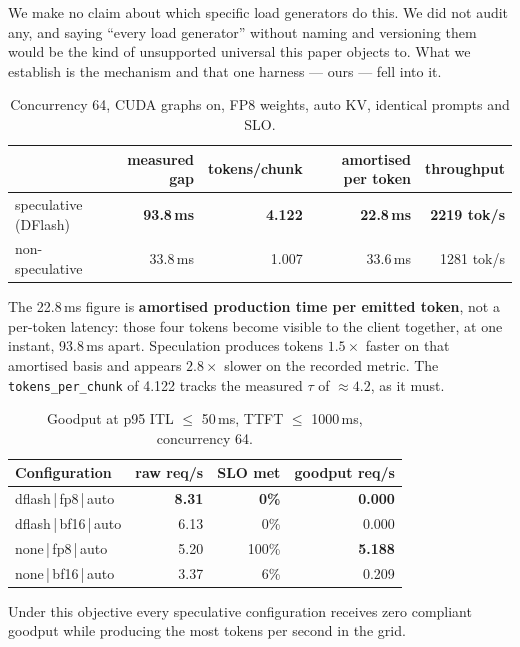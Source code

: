 \documentclass[11pt]{article}
\newcommand{\tw}[1]{\texttt{\small #1}}
\begin{document}
We make no claim about which specific load generators do this. We did not
audit any, and saying ``every load generator'' without naming and versioning
them would be the kind of unsupported universal this paper objects to. What
we establish is the mechanism and that one harness --- ours --- fell into
it.

\begin{table}[h]\centering\small
\caption{Concurrency 64, CUDA graphs on, FP8 weights, auto KV, identical
prompts and SLO.}
\begin{tabular}{lrrrr}
\toprule
& measured gap & tokens/chunk & amortised per token & throughput\\
\midrule
speculative (DFlash) & \textbf{93.8\,ms} & \textbf{4.122} & \textbf{22.8\,ms} & \textbf{2219 tok/s}\\
non-speculative & 33.8\,ms & 1.007 & 33.6\,ms & 1281 tok/s\\
\bottomrule
\end{tabular}
\end{table}

\noindent
The 22.8\,ms figure is \textbf{amortised production time per emitted token},
not a per-token latency: those four tokens become visible to the client
together, at one instant, 93.8\,ms apart. Speculation produces tokens
$1.5\times$ faster on that amortised basis and appears $2.8\times$ slower on
the recorded metric. The \tw{tokens\_per\_chunk} of 4.122 tracks the
measured $\tau$ of ${\approx}4.2$, as it must.

\begin{table}[h]\centering\small
\caption{Goodput at p95 ITL $\le$ 50\,ms, TTFT $\le$ 1000\,ms, concurrency 64.}
\begin{tabular}{lrrr}
\toprule
Configuration & raw req/s & SLO met & goodput req/s\\
\midrule
dflash\,|\,fp8\,|\,auto & \textbf{8.31} & \textbf{0\%} & \textbf{0.000}\\
dflash\,|\,bf16\,|\,auto & 6.13 & 0\% & 0.000\\
none\,|\,fp8\,|\,auto & 5.20 & 100\% & \textbf{5.188}\\
none\,|\,bf16\,|\,auto & 3.37 & 6\% & 0.209\\
\bottomrule
\end{tabular}
\end{table}

\noindent
Under this objective every speculative configuration receives zero compliant
goodput while producing the most tokens per second in the grid.
\end{document}
